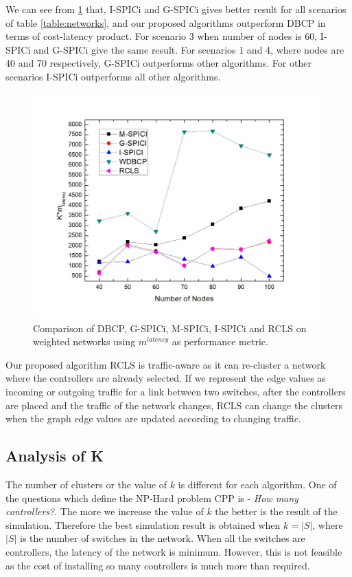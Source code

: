 \documentclass[a4paper,twocolumn,preprint]{elsarticle}
\begin{document}
We can see from \ref{fig:wgraphmul} that, I-SPICi and G-SPICi gives better result for all scenarios of table \ref{table:networks}, and our proposed algorithms outperform DBCP in terms of cost-latency product. For scenario 3 when number of nodes is 60, I-SPICi and G-SPICi give the same result. For scenarios 1 and 4, where nodes are 40 and 70 respectively, G-SPICi outperforms other algorithms. For other scenarios I-SPICi outperforms all other algorithms.

\begin{figure}
	\includegraphics[width=\linewidth]{wgraphmul.jpg}
	\caption{Comparison of DBCP, G-SPICi, M-SPICi, I-SPICi and RCLS on weighted networks using $m^{latency}$ as performance metric.}
	\label{fig:wgraphmul}
\end{figure}

Our proposed algorithm RCLS is traffic-aware as it can re-cluster a network where the controllers are already selected. If we represent the edge values as incoming or outgoing traffic for a link between two switches, after the controllers are placed and the traffic of the network changes, RCLS can change the clusters when the graph edge values are updated according to changing traffic.

\subsection{Analysis of K}
The number of clusters or the value of $k$ is different for each algorithm. One of the questions which define the NP-Hard problem CPP is - \emph{How many controllers?}. The more we increase the value of $k$ the better is the result of the simulation. Therefore the best simulation result is obtained when $k=|S|$, where $|S|$ is the number of switches in the network. When all the switches are controllers, the latency of the network is minimum. However, this is not feasible as the cost of installing so many controllers is much more than required.
\end{document}
